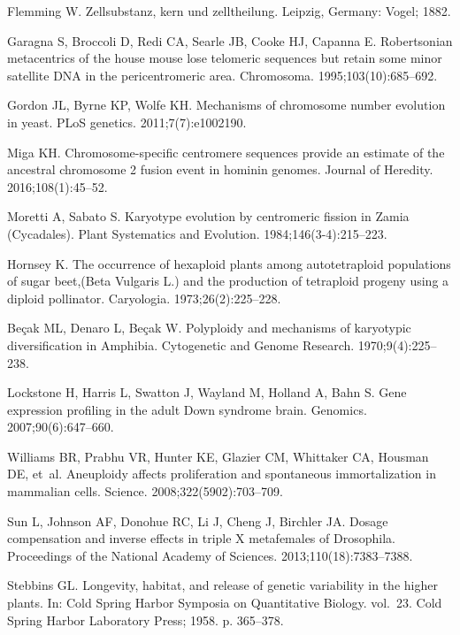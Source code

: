 \documentclass[]{rsos}%
\begin{document}
\newpage
\begin{thebibliography}{99}

Flemming W. 
 Zellsubstanz, kern und zelltheilung. Leipzig, Germany: Vogel; 1882.

Garagna S, Broccoli D, Redi CA, Searle JB, Cooke HJ, Capanna E.
 Robertsonian metacentrics of the house mouse lose telomeric sequences
  but retain some minor satellite DNA in the pericentromeric area.
 Chromosoma. 1995;103(10):685--692.

Gordon JL, Byrne KP, Wolfe KH.
 Mechanisms of chromosome number evolution in yeast.
 PLoS genetics. 2011;7(7):e1002190.

Miga KH.
 Chromosome-specific centromere sequences provide an estimate of the
  ancestral chromosome 2 fusion event in hominin genomes.
 Journal of Heredity. 2016;108(1):45--52.

Moretti A, Sabato S.
 Karyotype evolution by centromeric fission in Zamia (Cycadales).
 Plant Systematics and Evolution. 1984;146(3-4):215--223.

Hornsey K.
 The occurrence of hexaploid plants among autotetraploid populations
  of sugar beet,(Beta Vulgaris L.) and the production of tetraploid progeny
  using a diploid pollinator.
 Caryologia. 1973;26(2):225--228.

Be{\c{c}}ak ML, Denaro L, Be{\c{c}}ak W.
 Polyploidy and mechanisms of karyotypic diversification in Amphibia.
 Cytogenetic and Genome Research. 1970;9(4):225--238.

Lockstone H, Harris L, Swatton J, Wayland M, Holland A, Bahn S.
 Gene expression profiling in the adult Down syndrome brain.
 Genomics. 2007;90(6):647--660.

Williams BR, Prabhu VR, Hunter KE, Glazier CM, Whittaker CA, Housman DE, et~al.
 Aneuploidy affects proliferation and spontaneous immortalization in
  mammalian cells.
 Science. 2008;322(5902):703--709.

Sun L, Johnson AF, Donohue RC, Li J, Cheng J, Birchler JA.
 Dosage compensation and inverse effects in triple X metafemales of
  Drosophila.
 Proceedings of the National Academy of Sciences.
  2013;110(18):7383--7388.

Stebbins GL.
 Longevity, habitat, and release of genetic variability in the higher
  plants.
 In: Cold Spring Harbor Symposia on Quantitative Biology. vol.~23.
  Cold Spring Harbor Laboratory Press; 1958. p. 365--378.


\end{thebibliography}
\end{document}
